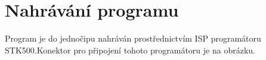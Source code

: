 \section{Nahrávání programu}\label{glob_prace_s_jednocipem_glob_nahravani_programu}
Program je do jednočipu nahráván prostřednictvím ISP programátoru STK500.Konektor pro připojení tohoto programátoru je na obrázku.

